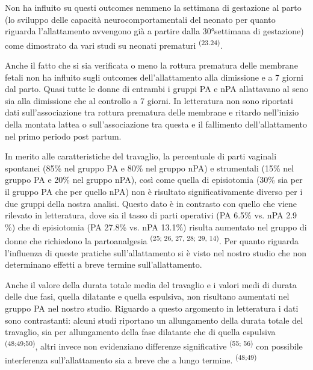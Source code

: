 \documentclass[]{article}
\begin{document}
Non ha influito su questi outcomes nemmeno la settimana di gestazione al
parto (lo sviluppo delle capacità neurocomportamentali del neonato per
quanto riguarda l'allattamento avvengono già a partire dalla
30°settimana di gestazione) come dimostrato da vari studi su neonati
prematuri \textsuperscript{(23.24)}.

Anche il fatto che si sia verificata o meno la rottura prematura delle
membrane fetali non ha influito sugli outcomes dell'allattamento alla
dimissione e a 7 giorni dal parto. Quasi tutte le donne di entrambi i
gruppi PA e nPA allattavano al seno sia alla dimissione che al controllo
a 7 giorni. In letteratura non sono riportati dati sull'associazione tra
rottura prematura delle membrane e ritardo nell'inizio della montata
lattea o sull'associazione tra questa e il fallimento dell'allattamento
nel primo periodo post partum.

In merito alle caratteristiche del travaglio, la percentuale di parti
vaginali spontanei (85\% nel gruppo PA e 80\% nel gruppo nPA) e
strumentali (15\% nel gruppo PA e 20\% nel gruppo nPA), così come quella
di episiotomia (30\% sia per il gruppo PA che per quello nPA) non è
risultato significativamente diverso per i due gruppi della nostra
analisi. Questo dato è in contrasto con quello che viene rilevato in
letteratura, dove sia il tasso di parti operativi (PA 6.5\% vs. nPA 2.9
\%) che di episiotomia (PA 27.8\% vs. nPA 13.1\%) risulta aumentato nel
gruppo di donne che richiedono la partoanalgesia \textsuperscript{(25;
26, 27, 28; 29, 14)}. Per quanto riguarda l'influenza di queste pratiche
sull'allattamento si è visto nel nostro studio che non determinano
effetti a breve termine sull'allattamento.

Anche il valore della durata totale media del travaglio e i valori medi
di durata delle due fasi, quella dilatante e quella espulsiva, non
risultano aumentati nel gruppo PA nel nostro studio. Riguardo a questo
argomento in letteratura i dati sono contrastanti: alcuni studi
riportano un allungamento della durata totale del travaglio, sia per
allungamento della fase dilatante che di quella espulsiva
\textsuperscript{(48;49;50)}, altri invece non evidenziano differenze
significative \textsuperscript{(55; 56)} con possibile interferenza
sull'allattamento sia a breve che a lungo termine.
\textsuperscript{(48;49)}
\end{document}
